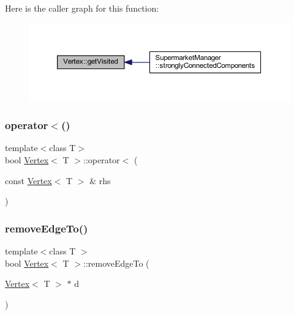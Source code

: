 Here is the caller graph for this function\+:
\nopagebreak
\begin{figure}[H]
\begin{center}
\leavevmode
\includegraphics[width=350pt]{class_vertex_a32cb66998d594d10170f448c9a25757c_icgraph}
\end{center}
\end{figure}
\mbox{\label{class_vertex_aa33a3fdb63962ffc6985458b9e0c428f}} 
\subsubsection{\texorpdfstring{operator$<$()}{operator<()}}
{\footnotesize\ttfamily template$<$class T$>$ \\
bool \hyperlink{class_vertex}{Vertex}$<$ T $>$\+::operator$<$ (\begin{DoxyParamCaption}\item[{const \hyperlink{class_vertex}{Vertex}$<$ T $>$ \&}]{rhs }\end{DoxyParamCaption})\hspace{0.3cm}{\ttfamily [inline]}}

\mbox{\label{class_vertex_ab2b5b43fb1709a901b78718436763a84}} 
\subsubsection{\texorpdfstring{remove\+Edge\+To()}{removeEdgeTo()}}
{\footnotesize\ttfamily template$<$class T $>$ \\
bool \hyperlink{class_vertex}{Vertex}$<$ T $>$\+::remove\+Edge\+To (\begin{DoxyParamCaption}\item[{\hyperlink{class_vertex}{Vertex}$<$ T $>$ $\ast$}]{d }\end{DoxyParamCaption})\hspace{0.3cm}{\ttfamily [private]}}

